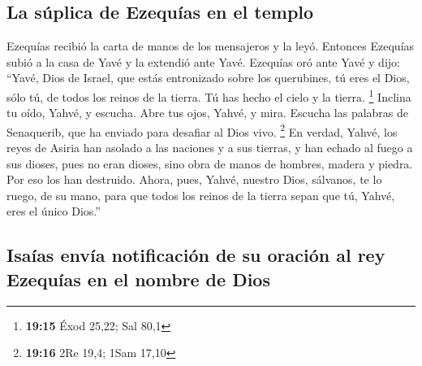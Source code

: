 \begin{paracol}{2}
\hypertarget{la-suxfaplica-de-ezequuxedas-en-el-templo}{%
\subsection{La súplica de Ezequías en el
templo}\label{la-suxfaplica-de-ezequuxedas-en-el-templo}}

 Ezequías recibió la carta de manos de los mensajeros y
la leyó. Entonces Ezequías subió a la casa de Yavé y la extendió ante
Yavé.  Ezequías oró ante Yavé y dijo: ``Yavé, Dios de
Israel, que estás entronizado sobre los querubines, tú eres el Dios,
sólo tú, de todos los reinos de la tierra. Tú has hecho el cielo y la
tierra. \footnote{\textbf{19:15} Éxod 25,22; Sal 80,1} 
Inclina tu oído, Yahvé, y escucha. Abre tus ojos, Yahvé, y mira. Escucha
las palabras de Senaquerib, que ha enviado para desafiar al Dios vivo.
\footnote{\textbf{19:16} 2Re 19,4; 1Sam 17,10}  En
verdad, Yahvé, los reyes de Asiria han asolado a las naciones y a sus
tierras,  y han echado al fuego a sus dioses, pues no
eran dioses, sino obra de manos de hombres, madera y piedra. Por eso los
han destruido.  Ahora, pues, Yahvé, nuestro Dios,
sálvanos, te lo ruego, de su mano, para que todos los reinos de la
tierra sepan que tú, Yahvé, eres el único Dios.''

\hypertarget{isauxedas-envuxeda-notificaciuxf3n-de-su-oraciuxf3n-al-rey-ezequuxedas-en-el-nombre-de-dios}{%
\subsection{Isaías envía notificación de su oración al rey Ezequías en
el nombre de
Dios}\label{isauxedas-envuxeda-notificaciuxf3n-de-su-oraciuxf3n-al-rey-ezequuxedas-en-el-nombre-de-dios}}


\end{paracol}
